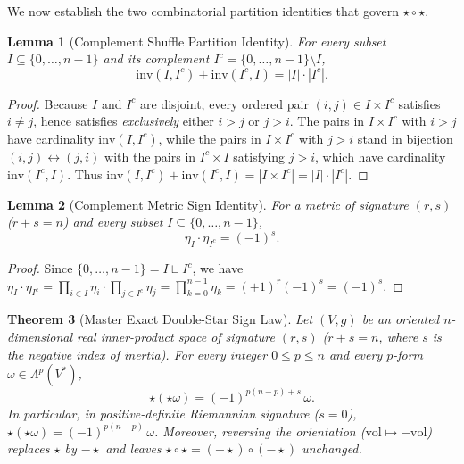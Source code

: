 \documentclass[11pt]{article}
\newtheorem{theorem}{Theorem}[section]
\newtheorem{lemma}[theorem]{Lemma}
\theoremstyle{definition}
\newcommand{\vol}{\mathrm{vol}}
\newcommand{\inv}{\mathrm{inv}}
\begin{document}
We now establish the two combinatorial partition identities that govern $\star \circ \star$.

\begin{lemma}[Complement Shuffle Partition Identity]\label{lem:shuffle-partition}
For every subset $I \subseteq \{0, \dots, n-1\}$ and its complement $I^c = \{0, \dots, n-1\} \setminus I$,
\begin{equation}\label{eq:shuffle-sum}
  \inv(I, I^c) + \inv(I^c, I) = |I| \cdot |I^c|.
\end{equation}
\end{lemma}

\begin{proof}
Because $I$ and $I^c$ are disjoint, every ordered pair $(i, j) \in I \times I^c$ satisfies $i \neq j$, hence satisfies \emph{exclusively} either $i > j$ or $j > i$. The pairs in $I \times I^c$ with $i > j$ have cardinality $\inv(I, I^c)$, while the pairs in $I \times I^c$ with $j > i$ stand in bijection $(i, j) \leftrightarrow (j, i)$ with the pairs in $I^c \times I$ satisfying $j > i$, which have cardinality $\inv(I^c, I)$. Thus $\inv(I, I^c) + \inv(I^c, I) = |I \times I^c| = |I|\cdot |I^c|$.
\end{proof}

\begin{lemma}[Complement Metric Sign Identity]\label{lem:metric-sign}
For a metric of signature $(r, s)$ ($r + s = n$) and every subset $I \subseteq \{0, \dots, n-1\}$,
\begin{equation}\label{eq:eta-product}
  \eta_I \cdot \eta_{I^c} = (-1)^s.
\end{equation}
\end{lemma}

\begin{proof}
Since $\{0, \dots, n-1\} = I \sqcup I^c$, we have $\eta_I \cdot \eta_{I^c} = \prod_{i \in I} \eta_i \cdot \prod_{j \in I^c} \eta_j = \prod_{k=0}^{n-1} \eta_k = (+1)^r (-1)^s = (-1)^s$.
\end{proof}

\begin{theorem}[Master Exact Double-Star Sign Law]\label{thm:double-star}
Let $(V, g)$ be an oriented $n$-dimensional real inner-product space of signature $(r, s)$ ($r + s = n$, where $s$ is the negative index of inertia). For every integer $0 \le p \le n$ and every $p$-form $\omega \in \Lambda^p(V^*)$,
\begin{equation}\label{eq:double-star}
  \star(\star\omega) = (-1)^{p(n-p)+s}\,\omega.
\end{equation}
In particular, in positive-definite Riemannian signature ($s = 0$), $\star(\star\omega) = (-1)^{p(n-p)}\,\omega$. Moreover, reversing the orientation ($\vol \mapsto -\vol$) replaces $\star$ by $-\star$ and leaves $\star \circ \star = (-\star) \circ (-\star)$ unchanged.
\end{theorem}
\end{document}
